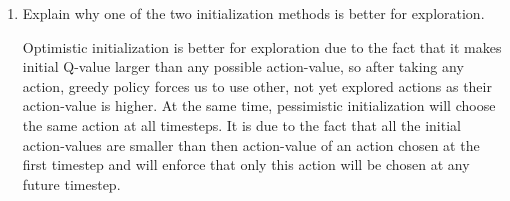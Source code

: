 \documentclass{exam}
\begin{document}
\begin{problem}[Exploration]
\begin{enumerate}
    \item Explain why one of the two initialization methods is better for exploration.
    \begin{solutionorlines}[2in]
        Optimistic initialization is better for exploration due to the fact that it makes initial Q-value larger than any possible action-value, so after taking any action, greedy policy forces us to use other, not yet explored actions as their action-value is higher. At the same time, pessimistic initialization will choose the same action at all timesteps. It is due to the fact that all the initial action-values are smaller than then action-value of an action chosen at the first timestep and will enforce that only this action will be chosen at any future timestep.
    \end{solutionorlines}
\end{enumerate}

\end{problem}




\end{document}

